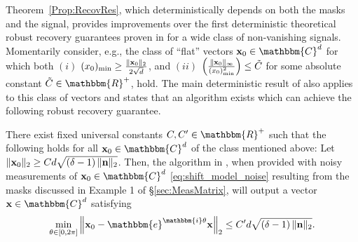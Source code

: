 Theorem~\ref{Prop:RecovRes}, which deterministically depends on both the masks and the signal, provides improvements over the first deterministic theoretical robust recovery guarantees proven in \cite{IVW2015_FastPhase} for a wide class of non-vanishing signals.  Momentarily consider, e.g., the class of ``flat'' vectors $\x_0 \in \mathbbm{C}^d$ for which both $(i)$ $(x_0)_{\rm min} \geq \frac{\| \mathbf x_0 \|_2}{2 \sqrt{d}}$, and $(ii)$ $\left( \frac{\Vert \mathbf x_0 \Vert_{\infty}}{(x_0)^2_{\rm min}} \right) \leq \tilde{C}$ for some absolute constant $\tilde{C} \in \mathbbm{R}^+$, hold.  The main deterministic result of \cite{IVW2015_FastPhase} also applies to this class of vectors and states that an algorithm exists which can achieve the following robust recovery guarantee.

\begin{thm}
There exist fixed universal constants $C,C' \in \mathbbm{R}^+$ such that the following holds for all $\x_0 \in \mathbbm{C}^d$ of the class mentioned above:  Let 
$\| \mathbf x_0 \|_2 \geq C d  \sqrt{\left(\delta - 1 \right)\| \mathbf n \|_2}$.  Then, the  algorithm in \cite{IVW2015_FastPhase}, when provided with noisy measurements of $\x_0 \in \mathbbm{C}^d$ \eqref{eq:shift_model_noise} resulting from the masks discussed in Example 1 of \S\ref{sec:MeasMatrix}, will output a vector  $\x \in \mathbbm{C}^d$ satisfying
\[ \min_{\theta \in [0, 2 \pi]} \left\Vert  \x_0 - \mathbbm{e}^{\mathbbm{i} \theta} \x \right\Vert_2 \leq C' d  \sqrt{\left(\delta - 1 \right)\| \n \|_2 }.\]
\label{Thm:OLDRecovRes}
\end{thm}

